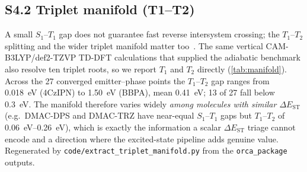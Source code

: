 \documentclass[final,3p,times,twocolumn]{elsarticle}
\begin{document}
\subsection*{S4.2 Triplet manifold (T1--T2)}\label{sec:triplet_manifold}
A small $S_1$--$T_1$ gap does not guarantee fast reverse intersystem crossing; the
$T_1$--$T_2$ splitting and the wider triplet manifold matter too~\cite{Keruckiene2024}.
The same vertical CAM-B3LYP/def2-TZVP TD-DFT calculations that supplied the adiabatic
benchmark also resolve ten triplet roots, so we report $T_1$ and $T_2$ directly
(\cref{tab:manifold}). Across the \num{27} converged emitter--phase points the $T_1$--$T_2$
gap ranges from \qty{0.018}{\electronvolt} (4CzIPN) to \qty{1.50}{\electronvolt} (BBPA),
mean \qty{0.41}{\electronvolt}; \num{13} of \num{27} fall below \qty{0.3}{\electronvolt}.
The manifold therefore varies widely \emph{among molecules with similar $\Delta E_\text{ST}$}
(e.g.\ DMAC-DPS and DMAC-TRZ have near-equal $S_1$--$T_1$ gaps but $T_1$--$T_2$ of
\qtyrange{0.06}{0.26}{\electronvolt}), which is exactly the information a scalar
$\Delta E_\text{ST}$ triage cannot encode and a direction where the excited-state pipeline
adds genuine value. Regenerated by \texttt{code/extract\_triplet\_manifold.py} from the
\texttt{orca\_package} outputs.
\end{document}

